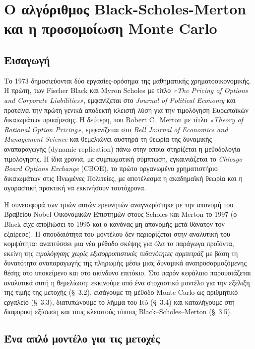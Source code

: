 \documentclass[12pt]{article}
\begin{document}
\newpage

\section{Ο αλγόριθμος Black-Scholes-Merton και η προσομοίωση Monte Carlo}
\subsection{Εισαγωγή}

Το 1973 δημοσιεύονται δύο εργασίες-ορόσημα της μαθηματικής χρηματοοικονομικής. Η πρώτη, των Fischer Black και Myron Scholes με τίτλο \emph{«The Pricing of Options and Corporate Liabilities»}, εμφανίζεται στο \emph{Journal of Political Economy} και προτείνει την πρώτη γενικά αποδεκτή κλειστή λύση για την τιμολόγηση Ευρωπαϊκών δικαιωμάτων προαίρεσης. Η δεύτερη, του Robert C.\ Merton με τίτλο \emph{«Theory of Rational Option Pricing»}, εμφανίζεται στο \emph{Bell Journal of Economics and Management Science} και θεμελιώνει αυστηρά τη θεωρία της δυναμικής αναπαραγωγής (dynamic replication) πάνω στην οποία στηρίζεται η μεθοδολογία τιμολόγησης. Η ίδια χρονιά, με συμπωματική σύμπτωση, εγκαινιάζεται το \emph{Chicago Board Options Exchange} (CBOE), το πρώτο οργανωμένο χρηματιστήριο δικαιωμάτων στις Ηνωμένες Πολιτείες, με αποτέλεσμα η ακαδημαϊκή θεωρία και η αγοραστική πρακτική να εκκινήσουν ταυτόχρονα.

Η συνεισφορά των τριών αυτών ερευνητών αναγνωρίστηκε με την απονομή του Βραβείου Nobel Οικονομικών Επιστημών στους Scholes και Merton το 1997 (ο Black είχε αποβιώσει το 1995 και ο κανόνας μη απονομής μετά θάνατον τον εξαίρεσε). Η σπουδαιότητα του μοντέλου δεν περιορίζεται στην αναλυτική του κομψότητα: αναπτύσσει μια νέα μέθοδο σκέψης για όλα τα παράγωγα προϊόντα, εκείνη της \emph{τιμολόγησης χωρίς εξισορροπιστικές πιθανότητες αρμπιτράζ} με βάση τη δυνατότητα αναπαραγωγής της πληρωμής μέσω μιας δυναμικά αναπροσαρμοζόμενης θέσης στο υποκείμενο και στο ακίνδυνο επιτόκιο. Στο παρόν κεφάλαιο παρουσιάζεται αναλυτικά αυτή η θεμελίωση: εκκινούμε από ένα στοχαστικό μοντέλο για την εξέλιξη της τιμής της μετοχής (\S~3.2), εισάγουμε τη μέθοδο Monte Carlo ως αριθμητικό εργαλείο (\S~3.3), διατυπώνουμε το λήμμα του Itô (\S~3.4) και καταλήγουμε στη διαφορική εξίσωση και τους κλειστούς τύπους Black–Scholes–Merton (\S~3.5).

\subsection{Ένα απλό μοντέλο για τις μετοχές}
\end{document}
